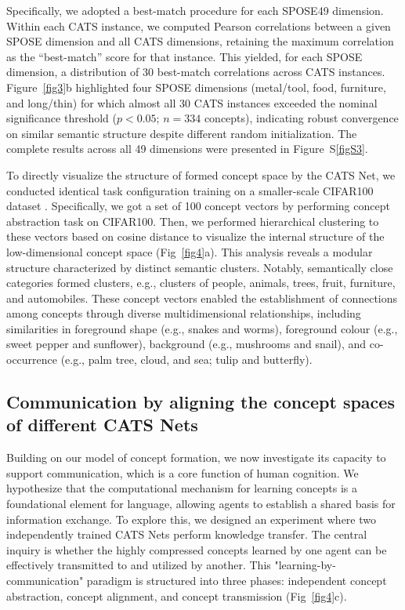\documentclass[pdflatex,sn-mathphys-num,lineno]{sn-jnl}%
\begin{document}
\begin{CJK}{UTF8}{gbsn}
Specifically, we adopted a best-match procedure for each SPOSE49 dimension. Within each CATS instance, we computed Pearson correlations between a given SPOSE dimension and all CATS dimensions, retaining the maximum correlation as the “best-match” score for that instance. This yielded, for each SPOSE dimension, a distribution of 30 best-match correlations across CATS instances. Figure~\ref{fig3}b highlighted four SPOSE dimensions (metal/tool, food, furniture, and long/thin) for which almost all 30 CATS instances exceeded the nominal significance threshold ($p < 0.05$; $n = 334$ concepts), indicating robust convergence on similar semantic structure despite different random initialization. The complete results across all 49 dimensions were presented in Figure~S\ref{figS3}.

To directly visualize the structure of formed concept space by the CATS Net, we conducted identical task configuration training on a smaller-scale CIFAR100 dataset \cite{krizhevsky_learning_2009}. Specifically, we got a set of 100 concept vectors by performing concept abstraction task on CIFAR100. Then, we performed hierarchical clustering to these vectors based on cosine distance to visualize the internal structure of the low-dimensional concept space (Fig~\ref{fig4}a). This analysis reveals a modular structure characterized by distinct semantic clusters. Notably, semantically close categories formed clusters, e.g., clusters of people, animals, trees, fruit, furniture, and automobiles. These concept vectors enabled the establishment of connections among concepts through diverse multidimensional relationships, including similarities in foreground shape (e.g., snakes and worms), foreground colour (e.g., sweet pepper and sunflower), background (e.g., mushrooms and snail), and co-occurrence (e.g., palm tree, cloud, and sea; tulip and butterfly).

\subsection{Communication by aligning the concept spaces of different CATS Nets}
Building on our model of concept formation, we now investigate its capacity to support communication, which is a core function of human cognition. We hypothesize that the computational mechanism for learning concepts is a foundational element for language, allowing agents to establish a shared basis for information exchange. To explore this, we designed an experiment where two independently trained CATS Nets perform knowledge transfer. The central inquiry is whether the highly compressed concepts learned by one agent can be effectively transmitted to and utilized by another. This "learning-by-communication" paradigm is structured into three phases: independent concept abstraction, concept alignment, and concept transmission (Fig~\ref{fig4}c).


\end{CJK}
\end{document}
